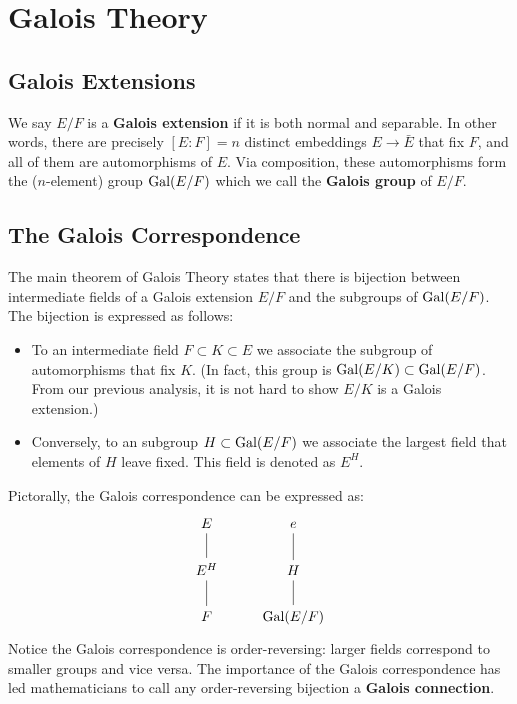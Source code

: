 \section{Galois Theory}

\subsection{Galois Extensions}

We say $E/F$ is a \textbf{Galois extension} if it is both normal and separable. In other words, there are precisely $[E : F] = n$ distinct embeddings $E \to \bar{E}$ that fix $F$, and all of them are automorphisms of $E$. Via composition, these automorphisms form the ($n$-element) group $\operatorname{Gal}(E/F)$ which we call the \textbf{Galois group} of $E/F$.

\subsection{The Galois Correspondence}

The main theorem of Galois Theory states that there is bijection between intermediate fields of a Galois extension $E/F$ and the subgroups of $\operatorname{Gal}(E/F)$. The bijection is expressed as follows:
\begin{itemize}
    \item To an intermediate field $F \subset K \subset E$ we associate the subgroup of automorphisms that fix $K$. (In fact, this group is $\operatorname{Gal}(E/K) \subset \operatorname{Gal}(E/F)$. From our previous analysis, it is not hard to show $E/K$ is a Galois extension.)
    \item Conversely, to an subgroup $H \subset \operatorname{Gal}(E/F)$ we associate the largest field that elements of $H$ leave fixed. This field is denoted as $E^H$.
\end{itemize}

Pictorally, the Galois correspondence can be expressed as:
\[
    \begin{tikzcd}
        E \arrow[d, no head]   & e \arrow[d, no head] \\
        E^H \arrow[d, no head] & H \arrow[d, no head] \\
        F                      & \Gal(E/F)           
    \end{tikzcd}
\]
Notice the Galois correspondence is order-reversing: larger fields correspond to smaller groups and vice versa. The importance of the Galois correspondence has led mathematicians to call any order-reversing bijection a \textbf{Galois connection}.

